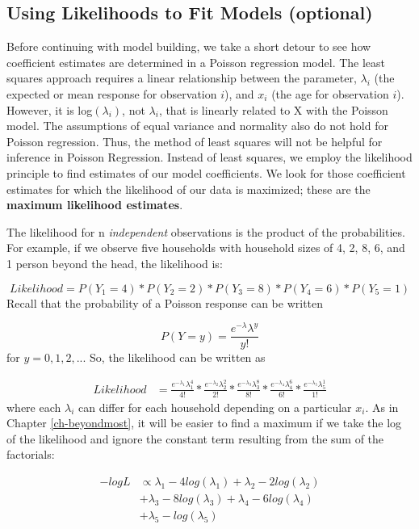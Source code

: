 \documentclass[
]{krantz}
\begin{document}
\subsection{Using Likelihoods to Fit Models (optional)}\label{likelihood.sec}

Before continuing with model building, we take a short detour to see how coefficient estimates are determined in a Poisson regression model. The least squares approach requires a linear relationship between the parameter, \(\lambda_i\) (the expected or mean response for observation \(i\)), and \(x_i\) (the age for observation \(i\)). However, it is log\((\lambda_i)\), not \(\lambda_i\), that is linearly related to X with the Poisson model. The assumptions of equal variance and normality also do not hold for Poisson regression. Thus, the method of least squares will not be helpful for inference in Poisson Regression. Instead of least squares, we employ the likelihood  principle to find estimates of our model coefficients. We look for those coefficient estimates for which the likelihood of our data is maximized; these are the \textbf{maximum likelihood estimates}. 

The likelihood for n \emph{independent}  observations is the product of the probabilities. For example, if we observe five households with household sizes of 4, 2, 8, 6, and 1 person beyond the head, the likelihood is:

\[ Likelihood = P(Y_1=4)*P(Y_2=2)*P(Y_3=8)*P(Y_4=6)*P(Y_5=1)\]
Recall that the probability of a Poisson response can be written

\[P(Y=y)=\frac{e^{-\lambda}\lambda^y}{y!}\]
for \(y = 0, 1, 2, ...\) So, the likelihood can be written as

\begin{align*}
 Likelihood&= \frac{ e^{-\lambda_1}\lambda_1^4 }{ 4! }*
 \frac{ e^{-\lambda_2}\lambda_2^2 }{ 2! } *\frac{e^{-\lambda_3}\lambda_3^8}{8!}*
 \frac{e^{-\lambda_4}\lambda_4^6}{6!}*\frac{e^{-\lambda_5}\lambda_5^1}{1!}
 \end{align*}
where each \(\lambda_i\) can differ for each household depending on a particular \(x_i\). As in Chapter \ref{ch-beyondmost}, it will be easier to find a maximum if we take the log of the likelihood and ignore the constant term resulting from the sum of the factorials:

\begin{align}
 -logL& \propto \lambda_{1}-4log(\lambda_{1})+\lambda_{2}-2log(\lambda_{2}) \nonumber \\
 & +\lambda_{3}-8log(\lambda_{3})+\lambda_{4}-6log(\lambda_{4}) \nonumber \\
 & +\lambda_{5}-log(\lambda_{5})
 \label{eq:poisLoglik}
\end{align}
\end{document}

